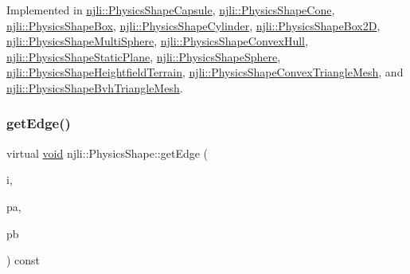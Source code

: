 Implemented in \mbox{\hyperlink{classnjli_1_1_physics_shape_capsule_a7d13876272eca6b0fd5d7f04392b134e}{njli\+::\+Physics\+Shape\+Capsule}}, \mbox{\hyperlink{classnjli_1_1_physics_shape_cone_a504851418142c2a7abd89c3861f09caf}{njli\+::\+Physics\+Shape\+Cone}}, \mbox{\hyperlink{classnjli_1_1_physics_shape_box_a3d4319affdfb39571fa631ae31317b57}{njli\+::\+Physics\+Shape\+Box}}, \mbox{\hyperlink{classnjli_1_1_physics_shape_cylinder_a9a87d86c692a3b1ce42c68354f312440}{njli\+::\+Physics\+Shape\+Cylinder}}, \mbox{\hyperlink{classnjli_1_1_physics_shape_box2_d_a484e8759584df9acd50c60740906b201}{njli\+::\+Physics\+Shape\+Box2D}}, \mbox{\hyperlink{classnjli_1_1_physics_shape_multi_sphere_a591dec07102b432fbced1b4bfd093512}{njli\+::\+Physics\+Shape\+Multi\+Sphere}}, \mbox{\hyperlink{classnjli_1_1_physics_shape_convex_hull_abd5ce039acdb2ff2654bbeb36db88ac4}{njli\+::\+Physics\+Shape\+Convex\+Hull}}, \mbox{\hyperlink{classnjli_1_1_physics_shape_static_plane_a3a3e5928c3f1a0e944c583025962f418}{njli\+::\+Physics\+Shape\+Static\+Plane}}, \mbox{\hyperlink{classnjli_1_1_physics_shape_sphere_a8929b088f8eac7b80215679f24da1abe}{njli\+::\+Physics\+Shape\+Sphere}}, \mbox{\hyperlink{classnjli_1_1_physics_shape_heightfield_terrain_a43635ec439d573213bae218901050d66}{njli\+::\+Physics\+Shape\+Heightfield\+Terrain}}, \mbox{\hyperlink{classnjli_1_1_physics_shape_convex_triangle_mesh_a86d32058509c5e63b3ec98c758648c34}{njli\+::\+Physics\+Shape\+Convex\+Triangle\+Mesh}}, and \mbox{\hyperlink{classnjli_1_1_physics_shape_bvh_triangle_mesh_ac4db6814bd13306aee765a71203525a4}{njli\+::\+Physics\+Shape\+Bvh\+Triangle\+Mesh}}.

\mbox{\label{classnjli_1_1_physics_shape_a657e98309a2a171ccb02a054a04c9b57}} 
\subsubsection{\texorpdfstring{get\+Edge()}{getEdge()}}
{\footnotesize\ttfamily virtual \mbox{\hyperlink{_thread_8h_af1e856da2e658414cb2456cb6f7ebc66}{void}} njli\+::\+Physics\+Shape\+::get\+Edge (\begin{DoxyParamCaption}\item[{int}]{i,  }\item[{bt\+Vector3 \&}]{pa,  }\item[{bt\+Vector3 \&}]{pb }\end{DoxyParamCaption}) const\hspace{0.3cm}{\ttfamily [pure virtual]}}

